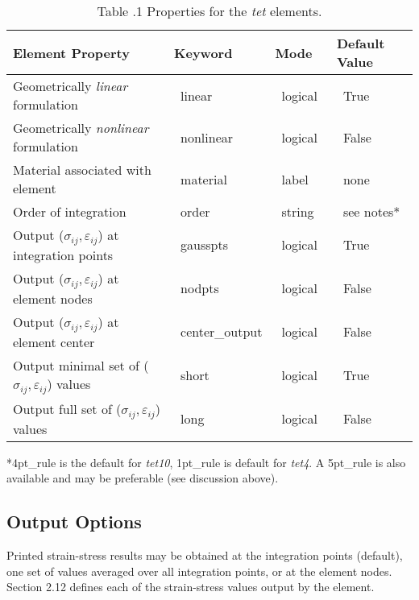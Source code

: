 \documentclass[11pt]{report}
\numberwithin{equation}{section}
\newcommand{\nf} {\normalsize}
\newcommand{\ti}{\emph}
\newcommand{\veps}{\varepsilon}
\newcommand{\tfour}{\ti{tet4}\xspace}
\begin{document}
\renewcommand{\arraystretch}{1.4}
\begin{table}[htb] 
\small
 \centering
 	\begin{tabular}{ |p{2.5in} | p{1.0in} | p{0.8in} |p{0.9in} | }
 	\hline
 	Element Property & Keyword & Mode & Default Value \\
 	\hline \hline
Geometrically \textit{linear} formulation &\ linear &\ logical\ &\ True\ \\ \hline 
Geometrically \textit{nonlinear} formulation &\ nonlinear &\ logical\ &\ False\ \\ \hline
Material associated with element & \ material	& \ label	& \ none \\ \hline
Order of integration &\ order & \ string	& \ see notes* \\ \hline
Output ($\sigma_{ij},\veps_{ij}$) at integration points & \ gausspts & \ logical	& \ True \\ \hline
Output ($\sigma_{ij},\veps_{ij}$) at element nodes & \ nodpts & \ logical	& \ False \\ \hline
Output ($\sigma_{ij},\veps_{ij}$) at element center & \ center\_output & \ logical & \ False \\ \hline
Output minimal set of ($\sigma_{ij},\veps_{ij}$) values & \ short & \ logical & \ True \\ \hline
Output full set of ($\sigma_{ij},\veps_{ij}$) values & \ long & \ logical & \ False \\ \hline
 	\end{tabular}
*4pt\_rule is the default for \ti{tet10}, 1pt\_rule is default for \tfour. A 5pt\_rule is also available 
and may be preferable (see discussion above). 	
  \caption{\small Table \thesection.1 
Properties for the \ti{tet} elements.
\nf}
 \label{table:tet_props}
\end{table}


\subsection {Output Options}
Printed strain-stress results may be obtained at the integration points
(default), one set of values averaged over all integration points, or at the element
nodes. Section 2.12  defines each of the strain-stress values output by the
element.
\end{document}
